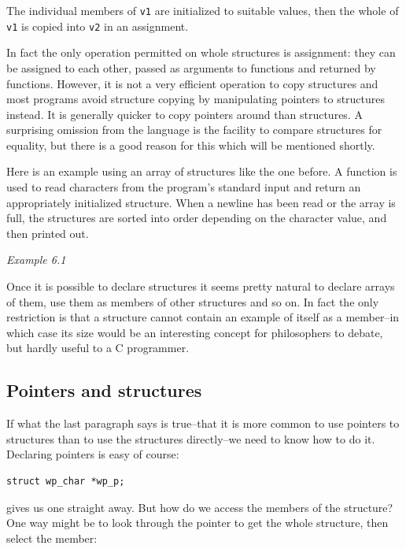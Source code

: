   The individual members of \texttt{v1} are initialized to suitable
   values, then the whole of \texttt{v1} is copied into \texttt{v2} in
   an assignment.


  In fact the only operation permitted on whole structures is assignment:
   they can be assigned to each other, passed as arguments to functions and
   returned by functions. However, it is not a very efficient operation to copy
   structures and most programs avoid structure copying by manipulating
   pointers to structures instead. It is generally quicker to copy pointers
   around than structures. A surprising omission from the language is the
   facility to compare structures for equality, but there is a good reason for
   this which will be mentioned shortly.


  Here is an example using an array of structures like the one before.
   A function is used to read characters from the program's standard input and
   return an appropriately initialized structure. When a newline has been read
   or the array is full, the structures are sorted into order depending on the
   character value, and then printed out.


   \begin{center}\textit{Example 6.1}\end{center}


  Once it is possible to declare structures it seems pretty natural to
   declare arrays of them, use them as members of other structures and so on.
   In fact the only restriction is that a structure cannot contain an example
   of itself as a member--in which case its size would be an interesting
   concept for philosophers to debate, but hardly useful to a C programmer.


  \subsection{Pointers and structures}
   

   If what the last paragraph says is true--that it is more common to
    use pointers to structures than to use the structures directly--we need
    to know how to do it. Declaring pointers is easy of course:


   \begin{Verbatim}
struct wp_char *wp_p;
\end{Verbatim}

   gives us one straight away. But how do we access the members of the
    structure? One way might be to look through the pointer to get the whole
    structure, then select the member:


